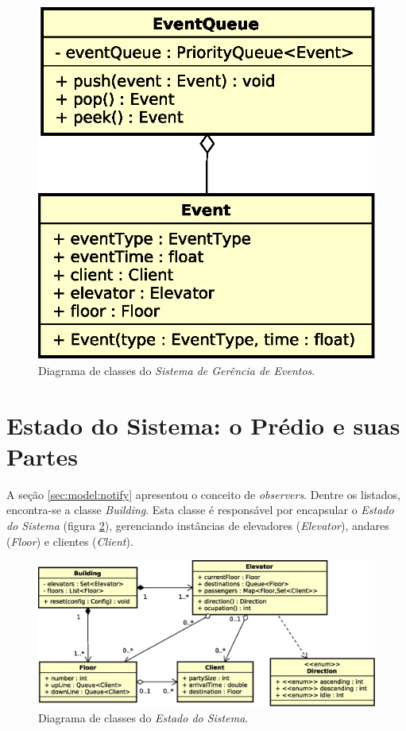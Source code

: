\begin{figure}[htb!]
  \centering
  \includegraphics[scale=0.6]{img/EventQueue.eps}
  \caption{Diagrama de classes do \textit{Sistema de Gerência de Eventos}.}
\label{fig:diagram:event:manage}
\end{figure}

\section{Estado do Sistema: o Prédio e suas Partes}

A seção \ref{sec:model:notify} apresentou o conceito de \textit{observers}.
Dentre os listados, encontra-se a classe \textit{Building}. Esta classe é
responsável por encapsular o \textit{Estado do Sistema} (figura
\ref{fig:diagram:system}), gerenciando instâncias de elevadores
(\textit{Elevator}), andares (\textit{Floor}) e clientes (\textit{Client}).

\begin{figure}[htb!]
  \centering
  \includegraphics[scale=0.6]{img/Model.eps}
  \caption{Diagrama de classes do \textit{Estado do Sistema}.}
\label{fig:diagram:system}
\end{figure}

